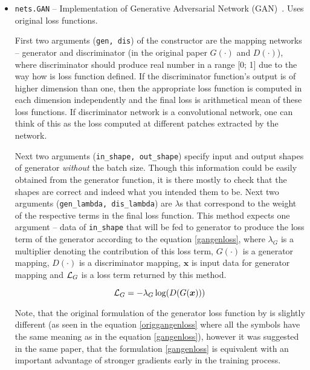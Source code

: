 \begin{itemize}
\item \texttt{nets.GAN} -- Implementation of Generative Adversarial Network (GAN)~\cite{origgan}. Uses original loss functions.

\begin{description}
 First two arguments (\texttt{gen, dis}) of the constructor are the mapping networks -- generator and discriminator (in the original paper $G(\cdot)$ and $D(\cdot)$), where discriminator should produce real number in a range [0; 1] due to the way how is loss function defined. If the discriminator function's output is of higher dimension than one, then the appropriate loss function is computed in each dimension independently and the final loss is arithmetical mean of these loss functions. If discriminator network is a convolutional network, one can think of this as the loss computed at different patches extracted by the network.

Next two arguments (\texttt{in\_shape, out\_shape}) specify input and output shapes of generator {\em without} the batch size. Though this information could be easily obtained from the generator function, it is there mostly to check that the shapes are correct and indeed what you intended them to be. Next two arguments (\texttt{gen\_lambda, dis\_lambda}) are $\lambda$s that correspond to the weight of the respective terms in the final loss function.
 This method expects one argument -- data of \texttt{in\_shape} that will be fed to generator to produce the loss term of the generator according to the equation \ref{gangenloss}, where $\lambda_G$ is a multiplier denoting the contribution of this loss term, $G(\cdot)$ is a generator mapping, $D(\cdot)$ is a discriminator mapping, $\bm{x}$ is input data for generator mapping and $\mathcal{L}_{G}$ is a loss term returned by this method.

\begin{equation}
\mathcal{L}_{G} = -\lambda_G\log(D(G(\bm{x})))
\label{gangenloss}
\end{equation}

Note, that the original formulation of the generator loss function by \cite{origgan} is slightly different (as seen in the equation \ref{origgangenloss} where all the symbols have the same meaning as in the equation \ref{gangenloss}), however it was suggested in the same paper, that the formulation \ref{gangenloss} is equivalent with an important advantage of stronger gradients early in the training process.


\end{description}
\end{itemize}
